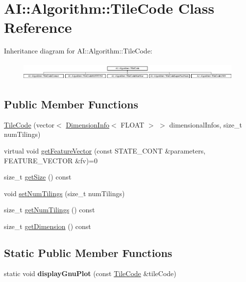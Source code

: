 \hypertarget{classAI_1_1Algorithm_1_1TileCode}{\section{A\-I\-:\-:Algorithm\-:\-:Tile\-Code Class Reference}
\label{classAI_1_1Algorithm_1_1TileCode}
}
Inheritance diagram for A\-I\-:\-:Algorithm\-:\-:Tile\-Code\-:\begin{figure}[H]
\begin{center}
\leavevmode
\includegraphics[height=0.957265cm]{classAI_1_1Algorithm_1_1TileCode}
\end{center}
\end{figure}
\subsection*{Public Member Functions}
\begin{DoxyCompactItemize}
\item 
\hyperlink{classAI_1_1Algorithm_1_1TileCode_a5c143dc170aca9699e68c808d91f1ffe}{Tile\-Code} (vector$<$ \hyperlink{classAI_1_1Algorithm_1_1DimensionInfo}{Dimension\-Info}$<$ F\-L\-O\-A\-T $>$ $>$ dimensional\-Infos, size\-\_\-t num\-Tilings)
\item 
virtual void \hyperlink{classAI_1_1Algorithm_1_1TileCode_ad2ba639c550e7d267d066e54b20f6000}{get\-Feature\-Vector} (const S\-T\-A\-T\-E\-\_\-\-C\-O\-N\-T \&parameters, F\-E\-A\-T\-U\-R\-E\-\_\-\-V\-E\-C\-T\-O\-R \&fv)=0
\item 
size\-\_\-t \hyperlink{classAI_1_1Algorithm_1_1TileCode_a3d757b2d7e6cf273c54f007230b69406}{get\-Size} () const 
\item 
void \hyperlink{classAI_1_1Algorithm_1_1TileCode_aad4bf93d21b47fe00c8e64957157dca1}{set\-Num\-Tilings} (size\-\_\-t num\-Tilings)
\item 
size\-\_\-t \hyperlink{classAI_1_1Algorithm_1_1TileCode_a540d24d750bf47835ed950b4ef54486a}{get\-Num\-Tilings} () const 
\item 
size\-\_\-t \hyperlink{classAI_1_1Algorithm_1_1TileCode_aa80f909ef2bf2039c4ea7b468bf796a5}{get\-Dimension} () const 
\end{DoxyCompactItemize}
\subsection*{Static Public Member Functions}
\begin{DoxyCompactItemize}
\item 
\hypertarget{classAI_1_1Algorithm_1_1TileCode_a420013442ffda741bba8a94fc4b09407}{static void {\bfseries display\-Gnu\-Plot} (const \hyperlink{classAI_1_1Algorithm_1_1TileCode}{Tile\-Code} \&tile\-Code)}\label{classAI_1_1Algorithm_1_1TileCode_a420013442ffda741bba8a94fc4b09407}

\end{DoxyCompactItemize}
